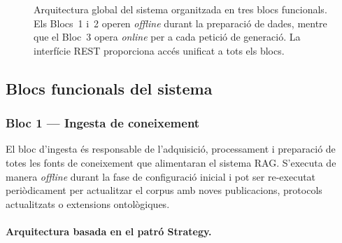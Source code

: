 \documentclass[CAT]{TFUOC}%
\begin{document}
\begin{figure}[H]
{
}
\caption{Arquitectura global del sistema organitzada en tres blocs funcionals. Els Blocs~1 i~2 operen \textit{offline} durant la preparació de dades, mentre que el Bloc~3 opera \textit{online} per a cada petició de generació. La interfície REST proporciona accés unificat a tots els blocs.}
\label{fig:system-blocks}
\end{figure}

\subsection{Blocs funcionals del sistema}

\subsubsection*{Bloc 1 --- Ingesta de coneixement}

El bloc d'ingesta és responsable de l'adquisició, processament i preparació de totes les fonts de coneixement que alimentaran el sistema RAG. S'executa de manera \textit{offline} durant la fase de configuració inicial i pot ser re-executat periòdicament per actualitzar el corpus amb noves publicacions, protocols actualitzats o extensions ontològiques.

\paragraph{Arquitectura basada en el patró Strategy.}
\end{document}
